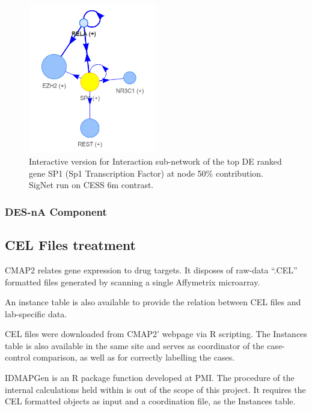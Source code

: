 \begin{figure}[!htbp]
    \centering
    \includegraphics[width=0.5\textwidth, height=\textheight, keepaspectratio]{Major Thesis/figures/iut/graph/iCESS6m50-SP1.png}
    \caption{Interactive version for Interaction sub-network of the top DE ranked gene SP1 (Sp1 Transcription Factor) at node 50\% contribution. SigNet run on CESS 6m contrast.}
    \label{section:suppl:results:cess-interactive}
\end{figure}

\subsubsection{DES-nA Component}


\subsection{CEL Files treatment}
CMAP2 \cite{Subramanian2017AProfiles} relates gene expression to drug targets. It disposes of raw-data “.CEL” formatted files generated by scanning a single Affymetrix microarray.

An instance table is also available to provide the relation between CEL files and lab-specific data.

CEL files were downloaded from CMAP2’ webpage via R scripting. The Instances table is also available in the same site and serves as coordinator of the case-control comparison, as well as for correctly labelling the cases.

IDMAPGen is an R package function developed at PMI. The procedure of the internal calculations held within is out of the scope of this project. It requires the CEL formatted objects as input and a coordination file, as the Instances table.

